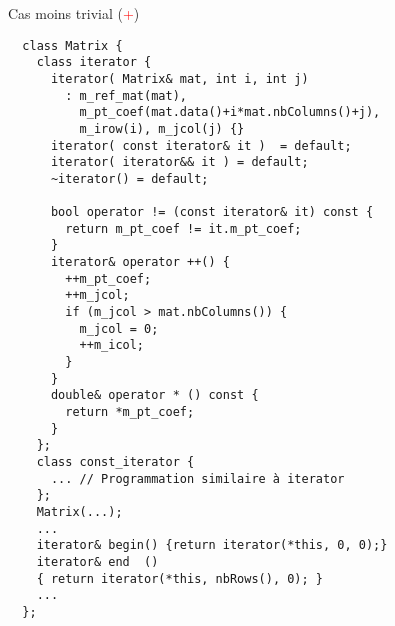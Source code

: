\documentclass[compress,10pt,aspectratio=169]{beamer}
\begin{document}
  \begin{frame}[fragile]{Cas moins trivial (\textcolor{red}{+})}
  \begin{multicols}{2}
  \begin{verbatim}
  class Matrix {
    class iterator {
      iterator( Matrix& mat, int i, int j) 
        : m_ref_mat(mat),
          m_pt_coef(mat.data()+i*mat.nbColumns()+j), 
          m_irow(i), m_jcol(j) {}
      iterator( const iterator& it )  = default;
      iterator( iterator&& it ) = default;
      ~iterator() = default;
                   
      bool operator != (const iterator& it) const {
        return m_pt_coef != it.m_pt_coef;
      }
      iterator& operator ++() {
        ++m_pt_coef;
        ++m_jcol;
        if (m_jcol > mat.nbColumns()) {
          m_jcol = 0;
          ++m_icol;
        }
      }
      double& operator * () const {
        return *m_pt_coef;
      }
    };
    class const_iterator { 
      ... // Programmation similaire à iterator
    };
    Matrix(...);
    ...
    iterator& begin() {return iterator(*this, 0, 0);}
    iterator& end  () 
    { return iterator(*this, nbRows(), 0); }
    ...
  };
  \end{verbatim}
  \end{multicols}
  \end{frame}
\end{document}

